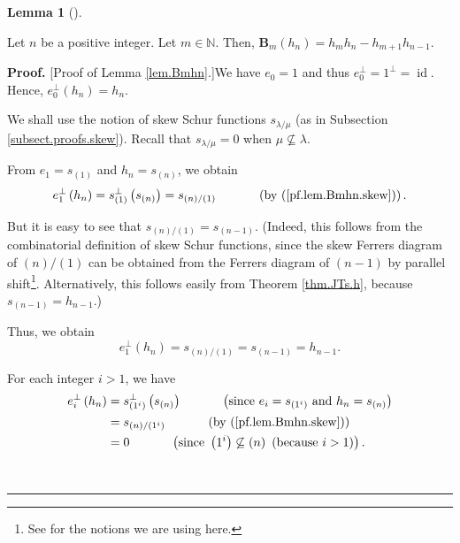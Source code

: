 \documentclass[numbers=enddot,12pt,final,onecolumn,notitlepage]{scrartcl}%
\theoremstyle{definition}
\newtheorem{lem}[theo]{Lemma}
\newenvironment{lemma}[1][]
{\begin{lem}[#1]\begin{leftbar}}
{\end{leftbar}\end{lem}}
\newenvironment{proof}[1][Proof]{\noindent\textbf{#1.} }{\ \rule{0.5em}{0.5em}}
\begin{document}
\begin{lemma}
\label{lem.Bmhn}Let $n$ be a positive integer. Let $m\in\mathbb{N}$. Then,
$\mathbf{B}_{m}\left(  h_{n}\right)  =h_{m}h_{n}-h_{m+1}h_{n-1}$.
\end{lemma}

\begin{proof}
[Proof of Lemma \ref{lem.Bmhn}.]We have $e_{0}=1$ and thus $e_{0}^{\perp
}=1^{\perp}=\operatorname*{id}$. Hence, $e_{0}^{\perp}\left(  h_{n}\right)
=h_{n}$.

We shall use the notion of skew Schur functions $s_{\lambda/\mu}$ (as in
Subsection \ref{subsect.proofs.skew}). Recall that $s_{\lambda/\mu}=0$ when
$\mu\not \subseteq \lambda$.

From $e_{1}=s_{\left(  1\right)  }$ and $h_{n}=s_{\left(  n\right)  }$, we
obtain%
\[
e_{1}^{\perp}\left(  h_{n}\right)  =s_{\left(  1\right)  }^{\perp}\left(
s_{\left(  n\right)  }\right)  =s_{\left(  n\right)  /\left(  1\right)
}\ \ \ \ \ \ \ \ \ \ \left(  \text{by (\ref{pf.lem.Bmhn.skew})}\right)  .
\]


But it is easy to see that $s_{\left(  n\right)  /\left(  1\right)
}=s_{\left(  n-1\right)  }$. (Indeed, this follows from the combinatorial
definition of skew Schur functions, since the skew Ferrers diagram of $\left(
n\right)  /\left(  1\right)  $ can be obtained from the Ferrers diagram of
$\left(  n-1\right)  $ by parallel shift\footnote{See \cite[\S 2.3]{GriRei}
for the notions we are using here.}. Alternatively, this follows easily from
Theorem \ref{thm.JTs.h}, because $s_{\left(  n-1\right)  }=h_{n-1}$.)

Thus, we obtain%
\[
e_{1}^{\perp}\left(  h_{n}\right)  =s_{\left(  n\right)  /\left(  1\right)
}=s_{\left(  n-1\right)  }=h_{n-1}.
\]


For each integer $i>1$, we have%
\begin{align}
e_{i}^{\perp}\left(  h_{n}\right)   &  =s_{\left(  1^{i}\right)  }^{\perp
}\left(  s_{\left(  n\right)  }\right)  \ \ \ \ \ \ \ \ \ \ \left(
\text{since }e_{i}=s_{\left(  1^{i}\right)  }\text{ and }h_{n}=s_{\left(
n\right)  }\right) \nonumber\\
&  =s_{\left(  n\right)  /\left(  1^{i}\right)  }\ \ \ \ \ \ \ \ \ \ \left(
\text{by (\ref{pf.lem.Bmhn.skew})}\right) \nonumber\\
&  =0\ \ \ \ \ \ \ \ \ \ \left(  \text{since }\left(  1^{i}\right)
\not \subseteq \left(  n\right)  \text{ (because }i>1\text{)}\right)  .
\label{pf.lem.Bmhn.3}%
\end{align}



\end{proof}
\end{document}
